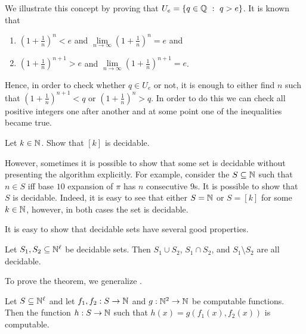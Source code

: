 We illustrate this concept by proving that
$U_e = \set[q > e]{q \in \Q}$. It is known that
\begin{enumerate}
    \item $(1 + \frac{1}{n})^n < e$ and
        $\lim\limits_{n \to \infty} (1 + \frac{1}{n})^n = e$ and
    \item $(1 + \frac{1}{n})^{n + 1} > e$ and
        $\lim\limits_{n \to \infty} (1 + \frac{1}{n})^{n + 1} = e$.
\end{enumerate}
Hence, in order to check whether $q \in U_e$ or not, it is enough to either find
$n$ such that $(1 + \frac{1}{n})^{n + 1} < q$ or $(1 + \frac{1}{n})^n > q$.
In order to do this we can check all positive integers one after another
and at some point one of the inequalities became true.

\begin{exercise}
  Let $k \in {\mathbb{N}}$. Show that $[k]$ is decidable.
\end{exercise}

However, sometimes it is possible to show that some set is decidable without
presenting the algorithm explicitly.
For example, consider the $S \subseteq {\mathbb{N}}$ such that $n \in S$ iff base $10$
expansion of $\pi$ has $n$ consecutive $9$s. It is possible to show that $S$ is
decidable. Indeed, it is easy to see that either $S = {\mathbb{N}}$ or $S = [k]$ for some
$k \in {\mathbb{N}}$, however, in both cases the set is decidable.


It is easy to show that decidable sets have several good properties.
\begin{theorem}
\label{theorem:operations-decidable}
  Let $S_1, S_2 \subseteq {\mathbb{N}}^\ell$ be decidable sets. Then $S_1 \cup S_2$,
  $S_1 \cap S_2$, and $S_1 \setminus S_2$ are all decidable.
\end{theorem}

To prove the theorem, we generalize .
\begin{theorem}
\label{theorem:composition-computable-generalization}
  Let $S \subseteq {\mathbb{N}}^\ell$ and let $f_1, f_2 : S \to {\mathbb{N}}$ and $g : {\mathbb{N}}^2 \to {\mathbb{N}}$
  be computable functions. Then the function $h : S \to {\mathbb{N}}$ such that
  $h(x) = g(f_1(x), f_2(x))$ is computable.
\end{theorem}

